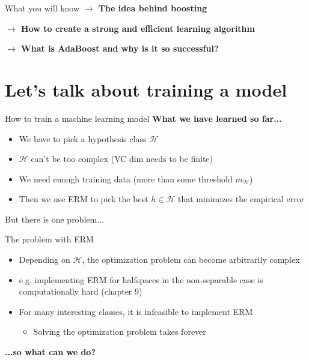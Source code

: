 \begin{frame}{What you will know}
    \textbf{$\rightarrow$ The idea behind boosting}
    
    \vspace{0.8cm}

    \textbf{$\rightarrow$ How to create a strong and efficient learning algorithm}

    \vspace{0.8cm}

    \textbf{$\rightarrow$ What is AdaBoost and why is it so successful?}
\end{frame}

\section{Let's talk about training a model}

\begin{frame}{How to train a machine learning model}
    \textbf{What we have learned so far...}
    \begin{itemize}
        \item We have to pick a hypothesis class $\mathcal{H}$
        \item $\mathcal{H}$ can't be too complex (VC dim needs to be finite)
        \item We need enough training data (more than some threshold $m_\mathcal{H}$)
        \item Then we use ERM to pick the best $h \in \mathcal{H}$ that minimizes the empirical error
    \end{itemize}
    But there is one problem...
\end{frame}

\begin{frame}{The problem with ERM}
\setlength{\fboxrule}{2pt}
    \begin{center}
    \end{center}
    \begin{itemize}
        \item Depending on $\mathcal{H}$, the optimization problem can become arbitrarily complex
        \item e.g. implementing ERM for halfspaces in the non-separable case is computationally hard (chapter 9)
        \item For many interesting classes, it is infeasible to implement ERM
        \begin{itemize}
            \item Solving the optimization problem takes forever
        \end{itemize}
    \end{itemize}
    \textbf{...so what can we do?}
\end{frame}


